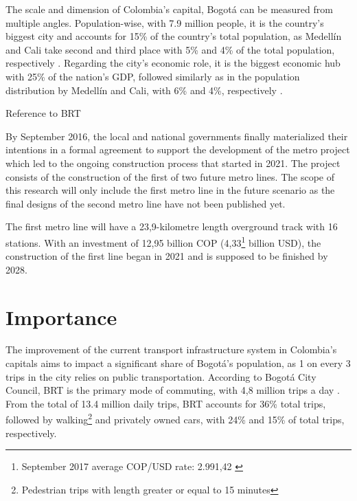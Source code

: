 \documentclass[12pt, a4paper]{report}
\begin{document}
The scale and dimension of Colombia's capital, Bogot\'{a} can be measured from multiple angles. Population-wise, with 7.9 million people, it is the country's biggest city and accounts for 15\% of the country's total population, as Medell\'{i}n and Cali take second and third place with 5\% and 4\% of the total population, respectively \citep{daneProyeccionesPoblacionPopulation2023}. Regarding the city's economic role, it is the biggest economic hub with 25\% of the nation's GDP, followed similarly as in the population distribution by Medell\'{i}n and Cali, with 6\% and 4\%, respectively \citep{daneCuentasNacionalesDepartamentales2023}.

Reference to BRT

By September 2016, the local and national governments finally materialized their intentions in a formal agreement to support the development of the metro project which led to the ongoing construction process that started in 2021. The project consists of the construction of the first of two future metro lines. The scope of this research will only include the first metro line in the future scenario as the final designs of the second metro line have not been published yet. 

The first metro line will have a 23,9-kilometre length overground track with 16 stations. With an investment of 12,95 billion COP (4,33\footnote{September 2017 average COP/USD rate: 2.991,42 \citep{bancodelarepublicaTasaCambioRepresentativa2023}} billion USD), the construction of the first line began in 2021 and is supposed to be finished by 2028.



\section{Importance}

The improvement of the current transport infrastructure system in Colombia's capitals aims to impact a significant share of Bogot\'{a}'s population, as 1 on every 3 trips in the city relies on public transportation. According to Bogot\'{a} City Council, BRT is the primary mode of commuting, with 4,8 million trips a day \citep{alcaldiadebogotaEncuestaMovilidad20192019}. From the total of 13.4 million daily trips, BRT accounts for 36\% total trips, followed by walking\footnote{Pedestrian trips with length greater or equal to 15 minutes} and privately owned cars, with 24\% and 15\% of total trips, respectively.
\end{document}
